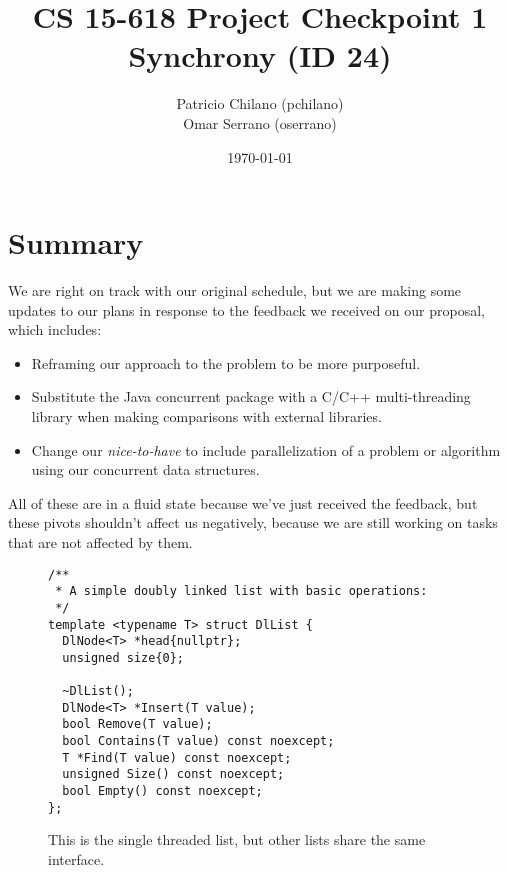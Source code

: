 \documentclass[11pt]{article}
\title{\vspace{-25pt}
\huge CS 15-618 Project Checkpoint 1 \\
\huge Synchrony (ID 24)
}
\author{
    Patricio Chilano (pchilano) \\
    Omar Serrano (oserrano)
}
\date{\today}
\begin{document}


\maketitle

\section*{Summary}
We are right on track with our original schedule, but we are making some updates to 
our plans in response to the feedback we received on our proposal, which includes:

\begin{itemize}
\item
Reframing our approach to the problem to be more purposeful.
\item
Substitute the Java concurrent package with a C/C++ multi-threading library when making comparisons with external libraries.
\item
Change our {\it nice-to-have} to include parallelization of a problem or algorithm using
our concurrent data structures.
\end{itemize}

All of these are in a fluid state because we've just received the feedback, but
these pivots shouldn't affect us negatively, because we are still working on
tasks that are not affected by them.

\begin{figure}
\begin{center}
\begin{lstlisting}
/**
 * A simple doubly linked list with basic operations:
 */
template <typename T> struct DlList {
  DlNode<T> *head{nullptr};
  unsigned size{0};

  ~DlList();
  DlNode<T> *Insert(T value);
  bool Remove(T value);
  bool Contains(T value) const noexcept;
  T *Find(T value) const noexcept;
  unsigned Size() const noexcept;
  bool Empty() const noexcept;
};
\end{lstlisting}
\caption{
This is the single threaded list, but other lists share the same interface.}
\label{fig:dllist}
\end{center}
\end{figure}
\end{document}
